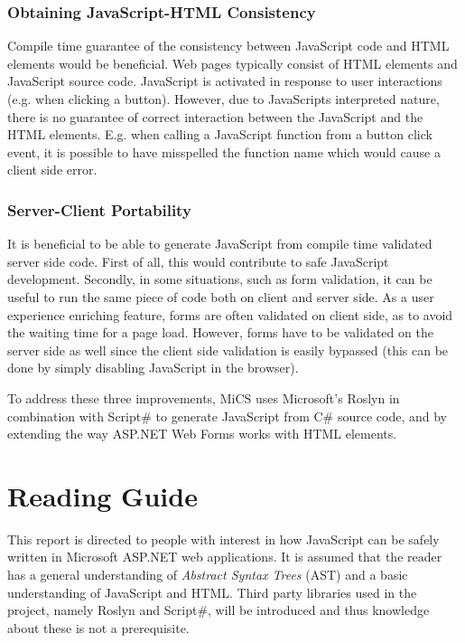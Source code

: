 \subsubsection{Obtaining JavaScript-HTML Consistency} %
\label{ssub:obtaining_javascript_html_consistency}
	Compile time guarantee of the consistency between JavaScript code and HTML elements would be beneficial. Web pages typically consist of HTML elements and JavaScript source code. JavaScript is activated in response to user interactions (e.g. when clicking a button). However, due to JavaScripts interpreted nature, there is no guarantee of correct interaction between the JavaScript and the HTML elements. E.g. when calling a JavaScript function from a button click event, it is possible to have misspelled the function name which would cause a client side error. 

\subsubsection{Server-Client Portability} %
	It is beneficial to be able to generate JavaScript from compile time validated server side code. First of all, this would contribute to safe JavaScript development. Secondly, in some situations, such as form validation, it can be useful to run the same piece of code both on client and server side. As a user experience enriching feature, forms are often validated on client side, as to avoid the waiting time for a page load. However, forms have to be validated on the server side as well since the client side validation is easily bypassed (this can be done by simply disabling JavaScript in the browser). \newline


To address these three improvements, MiCS uses Microsoft's Roslyn in combination with Script\# to generate JavaScript from C\# source code, and by extending the way ASP.NET Web Forms works with HTML elements.

\section{Reading Guide}

	This report is directed to people with interest in how JavaScript can be safely written in Microsoft ASP.NET web applications. It is assumed that the reader has a general understanding of \emph{Abstract Syntax Trees} (AST) and a basic understanding of JavaScript and HTML. Third party libraries used in the project, namely Roslyn and Script\#, will be introduced and thus knowledge about these is not a prerequisite.

